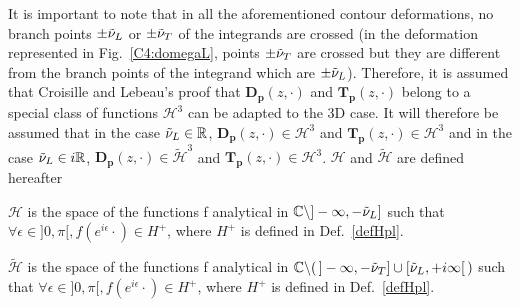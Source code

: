 It is important to note that in all the aforementioned contour deformations, no branch points $\pm \tilde{\nu}_L$ or $\pm \tilde{\nu}_T$ of the integrands are crossed (in the deformation represented in Fig.~\ref{C4:domegaL}, points $\pm \tilde{\nu}_T$ are crossed but they are different from the branch points of the integrand which are $\pm \tilde{\nu}_L$). Therefore, it is assumed that Croisille and Lebeau's \cite{CroisilleLebeau} proof that $\mathbf{D_p}(z,\cdot)$ and $\mathbf{T_p}(z,\cdot)$ belong to a special class of functions $\mathcal{H}^3$ can be adapted to the 3D case. It will therefore be assumed that in the case $\tilde{\nu}_L \in \mathbb{R}$, $\mathbf{D_p}(z,\cdot) \in \mathcal{H}^3$ and $\mathbf{T_p}(z,\cdot) \in \mathcal{H}^3$ and in the case $\tilde{\nu}_L \in i\mathbb{R}$, $\mathbf{D_p}(z,\cdot) \in \tilde{\mathcal{H}}^3$ and $\mathbf{T_p}(z,\cdot) \in \mathcal{H}^3$. $\mathcal{H}$ and $\tilde{\mathcal{H}}$ are defined hereafter
\begin{definition}
\label{C4:defH}
$\mathcal{H}$ is the space of the functions f analytical in $\mathbb{C}\backslash \rbrack -\infty,-\tilde{\nu}_L\rbrack$ such that $\forall \epsilon \in \rbrack0,\pi \lbrack, f(e^{i\epsilon} \cdot)\in H^+$, where $H^+$ is defined in Def.~\ref{defHpl}.
\end{definition}
\begin{definition}
\label{C4:defHcrit}
$\tilde{\mathcal{H}}$ is the space of the functions f analytical in  $\mathbb{C} \backslash ( \, \rbrack - \infty, -\tilde{\nu}_T \rbrack \cup \lbrack \tilde{\nu}_L,+i\infty \lbrack \,)$ such that $\forall \epsilon \in \rbrack0,\pi \lbrack, f(e^{i\epsilon} \cdot)\in H^+$, where $H^+$ is defined in Def.~\ref{defHpl}.
\end{definition}

